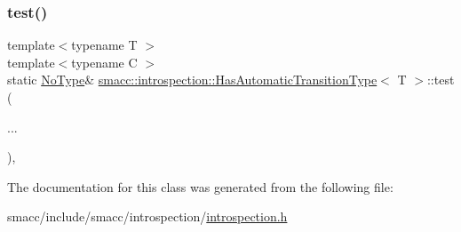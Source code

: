 \mbox{\label{classsmacc_1_1introspection_1_1HasAutomaticTransitionType_a660ac4a6eac5d86d133f2cfb905d22f3}} 
\subsubsection{\texorpdfstring{test()}{test()}\hspace{0.1cm}{\footnotesize\ttfamily [2/2]}}
{\footnotesize\ttfamily template$<$typename T $>$ \\
template$<$typename C $>$ \\
static \hyperlink{classsmacc_1_1introspection_1_1HasAutomaticTransitionType_aa2e976214fc770f53aaae67fc049caab}{No\+Type}\& \hyperlink{classsmacc_1_1introspection_1_1HasAutomaticTransitionType}{smacc\+::introspection\+::\+Has\+Automatic\+Transition\+Type}$<$ T $>$\+::test (\begin{DoxyParamCaption}\item[{}]{... }\end{DoxyParamCaption})\hspace{0.3cm}{\ttfamily [static]}, {\ttfamily [private]}}



The documentation for this class was generated from the following file\+:\begin{DoxyCompactItemize}
\item 
smacc/include/smacc/introspection/\hyperlink{introspection_8h}{introspection.\+h}\end{DoxyCompactItemize}
